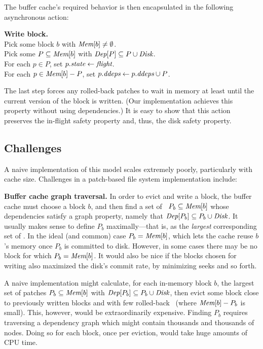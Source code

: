The buffer cache's required behavior is then encapsulated in the following
asynchronous action:

\begin{tabbing}
\textbf{Write block.} \\
\quad Pick some block $b$ with $\PMem[b] \neq \emptyset$. \\
\quad Pick some $P \subseteq \PMem[b]$ with $\PDepset{P} \subseteq P \cup
\PDisk$. \\
\quad For each $p \in P$, set $p.\textit{state} \gets \textit{flight}$. \\
\quad For each $p \in \PMem[b]-P$, set $\PDDepset{p} \gets \PDDepset{p}
\cup P$.
\end{tabbing}

\noindent
%
The last step forces any rolled-back patches to wait in memory at least
until the current version of the block is written.  (Our implementation
achieves this property without using dependencies.)
%
It is easy to show that this action preserves the in-flight safety property
and, thus, the disk safety property.


\subsection{Challenges}

A naive implementation of this model scales extremely poorly,
particularly with cache size.
%
Challenges in a patch-based file system implementation include:

\textbf{Buffer cache graph traversal.}
%
In order to evict and write a block, the buffer cache must choose a block
$b$,
%
and then find a set of \patches\ $P_b \subseteq \PMem[b]$ whose dependencies
satisfy a graph property, namely that $\PDepset{P_b} \subseteq P_b \cup
\PDisk$.
%
It usually makes sense to define $P_b$ maximally---that is, as the
\emph{largest} corresponding set of \patches.
%
In the ideal (and common) case $P_b = \PMem[b]$, which lets the cache reuse
$b$'s memory once $P_b$ is committed to disk.  However, in some cases there
may be no block for which $P_b = \PMem[b]$.
%
It would also be nice if the blocks chosen for writing also maximized the
disk's commit rate, by minimizing seeks and so forth.

A naive implementation might calculate, for each in-memory block $b$, the
largest set of patches $P_b \subseteq \PMem[b]$ with $\PDepset{P_b}
\subseteq P_b \cup \PDisk$, then evict some block close to previously
written blocks and with few rolled-back \patches\ (where $\PMem[b] - P_b$
is small).
%
This, however, would be extraordinarily expensive.
%
Finding $P_b$ requires traversing a dependency graph which might contain
thousands and thousands of nodes.
%
Doing so for each block, once per eviction, would take huge amounts of CPU
time.


